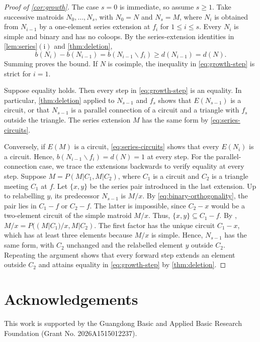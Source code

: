 \documentclass[10pt,a4paper]{article}
\numberwithin{equation}{section}
\begin{document}
\begin{proof}[Proof of \autoref{cor:growth}]
The case \(s=0\) is immediate, so assume \(s\ge1\).
Take successive matroids \(N_0,\ldots,N_s\), with \(N_0=N\) and \(N_s=M\),
where \(N_i\) is obtained from \(N_{i-1}\) by a one-element series
extension at \(f_i\) for \(1\le i\le s\).
Every \(N_i\) is simple and binary and has no coloops.
By the series-extension identities in \autoref{lem:series}\(\mathrm{(i)}\)
and \autoref{thm:deletion},
\begin{equation}\label{eq:growth-step}
 b(N_i)-b(N_{i-1})=b(N_{i-1}\backslash f_i)
 \ge d(N_{i-1})=d(N).
\end{equation}
Summing proves the bound. If \(N\) is cosimple,
the inequality in \eqref{eq:growth-step} is strict for \(i=1\).

Suppose equality holds. Then every step in \eqref{eq:growth-step}
is an equality. In particular, \autoref{thm:deletion} applied to
\(N_{s-1}\) and \(f_s\) shows that \(E(N_{s-1})\) is a circuit, or that
\(N_{s-1}\) is a parallel connection of a circuit and a triangle with
\(f_s\) outside the triangle. The series extension \(M\) has the same
form by \eqref{eq:series-circuits}.

Conversely, if \(E(M)\) is a circuit, \eqref{eq:series-circuits} shows that
every \(E(N_i)\) is a circuit. Hence,
\(b(N_{i-1}\backslash f_i)=d(N)=1\) at every step.
For the parallel-connection case, we trace the extensions backwards
to verify equality at every step.
Suppose \(M=P(M|C_1,M|C_2)\), where \(C_1\) is a circuit
and \(C_2\) is a triangle meeting \(C_1\) at \(f\).
Let \(\{x,y\}\) be the series pair introduced in the last extension.
Up to relabelling \(y\), its predecessor \(N_{s-1}\) is \(M/x\).
By \eqref{eq:binary-orthogonality}, the pair lies in
\(C_1-f\) or \(C_2-f\). The latter is impossible, since
\(C_2-x\) would be a two-element circuit of the simple matroid \(M/x\).
Thus, \(\{x,y\}\subseteq C_1-f\). By
\cite[Proposition~7.1.15(v)]{Oxley2011},
\(M/x=P((M|C_1)/x,M|C_2)\).
The first factor has the unique circuit \(C_1-x\), which has at least
three elements because \(M/x\) is simple.
Hence, \(N_{s-1}\) has the same form, with \(C_2\) unchanged
and the relabelled element \(y\) outside \(C_2\).
Repeating the argument shows that every forward step extends an
element outside \(C_2\) and attains equality in \eqref{eq:growth-step}
by \autoref{thm:deletion}.
\end{proof}
\section*{Acknowledgements}
This work is supported by the Guangdong Basic and Applied Basic Research Foundation (Grant No. 2026A1515012237).
\end{document}
